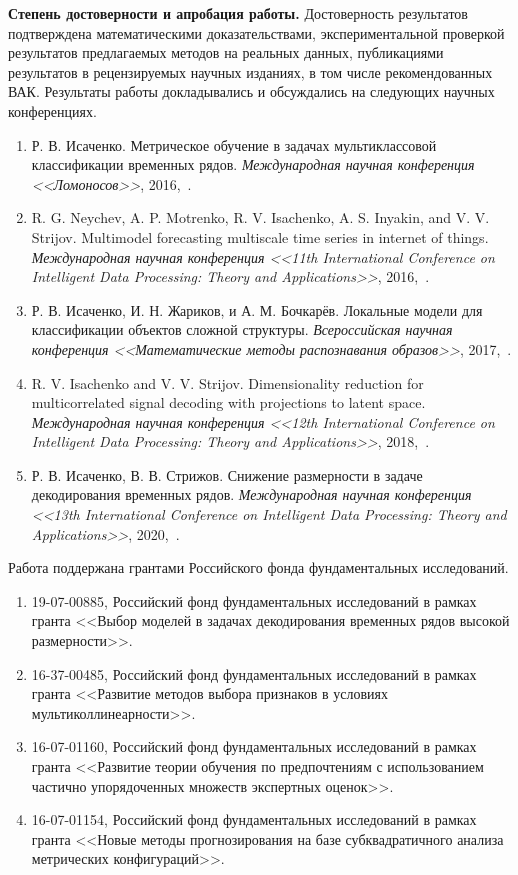\vspace{0.5cm}
\textbf{Степень достоверности и апробация работы.}
Достоверность результатов подтверждена математическими доказательствами, экспериментальной проверкой результатов предлагаемых методов на реальных данных, публикациями результатов в рецензируемых научных изданиях, в том числе рекомендованных ВАК. 
Результаты работы докладывались и обсуждались на следующих научных конференциях.
\begin{enumerate}
	\item Р. В. Исаченко. Метрическое обучение в задачах мультиклассовой классификации временных рядов. \textit{Международная научная конференция <<Ломоносов>>}, 2016,~\cite{isachenko2016lomonosov}.
	\item R. G. Neychev, A. P. Motrenko, R. V. Isachenko, A. S. Inyakin, and V. V. Strijov. Multimodel forecasting multiscale time series in internet of things. \textit{Международная научная конференция  <<11th International Conference on Intelligent Data Processing: Theory and Applications>>}, 2016,~\cite{Neychev2016IDP}.
	\item Р. В. Исаченко, И. Н. Жариков, и А. М. Бочкарёв. Локальные модели для классификации объектов сложной структуры. \textit{Всероссийская научная конференция <<Математические методы распознавания образов>>}, 2017,~\cite{isachenko2017localmmro}.
	\item R. V. Isachenko and V. V. Strijov. Dimensionality reduction for multicorrelated signal decoding with projections to latent space. \textit{Международная научная конференция  <<12th International Conference on Intelligent Data Processing: Theory and Applications>>}, 2018,~\cite{Isachenko2018plsidp}.
	\item Р. В. Исаченко, В. В. Стрижов. Снижение размерности в задаче декодирования временных рядов. \textit{Международная научная конференция  <<13th International Conference on Intelligent Data Processing: Theory and Applications>>}, 2020,~\cite{Isachenko2020plsidp}.
\end{enumerate} 

Работа поддержана грантами Российского фонда фундаментальных исследований.
\begin{enumerate}
	\item 19-07-00885, Российский фонд фундаментальных исследований в рамках гранта <<Выбор моделей в задачах декодирования временных рядов высокой размерности>>.
	\item 16-37-00485, Российский фонд фундаментальных исследований в рамках гранта <<Развитие методов выбора признаков в условиях мультиколлинеарности>>.
	\item 16-07-01160, Российский фонд фундаментальных исследований в рамках гранта <<Развитие теории обучения по предпочтениям с использованием частично упорядоченных множеств экспертных оценок>>.
	\item 16-07-01154, Российский фонд фундаментальных исследований в рамках гранта <<Новые методы прогнозирования на базе субквадратичного анализа метрических конфигураций>>.
\end{enumerate}


